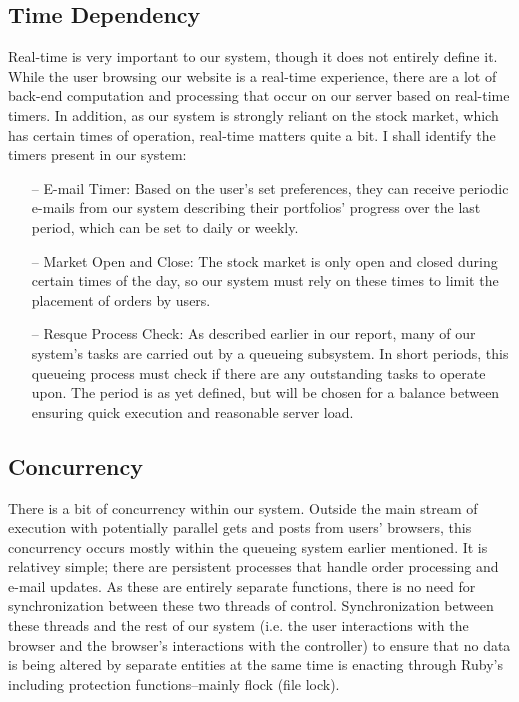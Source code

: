 \subsection{Time Dependency}
Real-time is very important to our system, though it does not entirely define it. While the user browsing our website is a real-time experience, there are a lot of back-end computation and processing that occur on our server based on real-time timers. In addition, as our system is strongly reliant on the stock market, which has certain times of operation, real-time matters quite a bit. I shall identify the timers present in our system:
\begin{itemize}
\item[--]{E-mail Timer: Based on the user's set preferences, they can receive periodic e-mails from our system describing their portfolios' progress over the last period, which can be set to daily or weekly.}
\item[--]{Market Open and Close: The stock market is only open and closed during certain times of the day, so our system must rely on these times to limit the placement of orders by users.}
\item[--]{Resque Process Check: As described earlier in our report, many of our system's tasks are carried out by a queueing subsystem. In short periods, this queueing process must check if there are any outstanding tasks to operate upon. The period is as yet defined, but will be chosen for a balance between ensuring quick execution and reasonable server load.}
\end{itemize}
\subsection{Concurrency}
There is a bit of concurrency within our system. Outside the main stream of execution with potentially parallel gets and posts from users' browsers, this concurrency occurs mostly within the queueing system earlier mentioned. It is relativey simple; there are persistent processes that handle order processing and e-mail updates. As these are entirely separate functions, there is no need for synchronization between these two threads of control. Synchronization between these threads and the rest of our system (i.e. the user interactions with the browser and the browser's interactions with the controller) to ensure that no data is being altered by separate entities at the same time is enacting through Ruby's including protection functions--mainly flock (file lock).